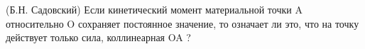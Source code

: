 (Б.Н. Садовский)
Если кинетический момент материальной точки A относительно O сохраняет
постоянное значение, то означает ли это, что на точку действует
только сила, коллинеарная OA ?
